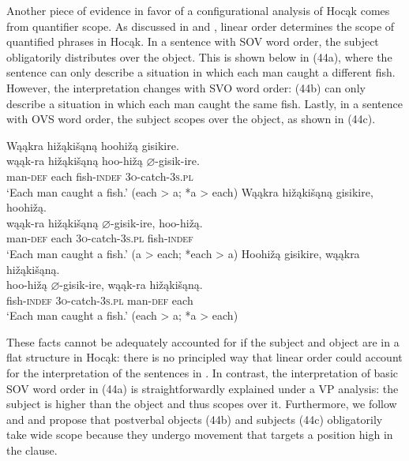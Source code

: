 \documentclass[output=paper]{LSP/langsci}
\begin{document}
Another piece of evidence in favor of a configurational analysis of Hocąk comes from quantifier scope. As discussed in \citealt{Johnson2014} and   \citealt{JohnsonRosen2014}, linear order determines the scope of quantified phrases in Hocąk. In a sentence with SOV word order, the subject obligatorily distributes over the object. This is shown below in (44a), where the sentence can only describe a situation in which each man caught a different fish. However, the interpretation changes with SVO word order: (44b) can only describe a situation in which each man caught the same fish. Lastly, in a sentence with OVS word order, the subject scopes over the object, as shown in (44c).

\begin{exe}
\ex\label{ex:jrs:44}
\begin{xlist}
\ex 
\glll Wąąkra	hi\v{z}ąki\v{s}ąną		hoohi\v{z}ą	gisikire.\\
wąąk-ra		hi\v{z}ąki\v{s}ąną		hoo-hi\v{z}ą	$\varnothing$-gisik-ire. \\
		man-\textsc{def}		each					fish-\textsc{indef}		\textsc{3o}-catch-\textsc{3s.pl} \\
\trans `Each man caught a fish.' (each > a; *a > each)
\ex 
\glll Wąąkra		hi\v{z}ąki\v{s}ąną		gisikire,			hoohi\v{z}ą.\\
wąąk-ra		hi\v{z}ąki\v{s}ąną		$\varnothing$-gisik-ire,	hoo-hi\v{z}ą. \\
		man-\textsc{def}		each					\textsc{3o}-catch-\textsc{3s.pl}		fish-\textsc{indef} \\
\trans `Each man caught a fish.'  (a > each; *each > a)
\ex 
\glll Hoohi\v{z}ą	gisikire,	wąąkra	 hi\v{z}ąki\v{s}ąną.\\
hoo-hi\v{z}ą	$\varnothing$-gisik-ire,		wąąk-ra	hi\v{z}ąki\v{s}ąną. \\
		fish-\textsc{indef}		\textsc{3o}-catch-\textsc{3s.pl}		man-\textsc{def}		each \\
\trans `Each man caught a fish.' (each > a; *a > each)
\end{xlist}
\end{exe}

These facts cannot be adequately accounted for if the subject and object are in a flat structure in Hocąk: there is no principled way that linear order could account for the interpretation of the sentences in . In contrast, the interpretation of basic SOV word order in (44a) is straightforwardly explained under a VP analysis: the subject is higher than the object and thus scopes over it. Furthermore, we follow \citet{Johnson2014} and  \citet{JohnsonRosen2014} and propose that postverbal objects (44b) and subjects (44c) obligatorily take wide scope because they undergo movement that targets a position high in the clause. 
\end{document}
